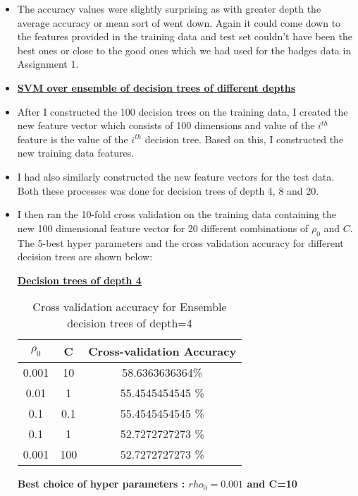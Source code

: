 \documentclass[11pt]{article}
\begin{document}
\begin{itemize}
\item The accuracy values were slightly surprising as with greater depth the average accuracy or mean sort of went down. Again it could come down to the features provided in the training data and test set couldn't  have been the best ones or close to the good ones which we had used for the badges data in Assignment 1.

\item[] \textbf{\underline{SVM over ensemble of decision trees of different depths }}

\item After I constructed the 100 decision trees on the training data, I created the new feature vector which consists of 100 dimensions and value of the $i^{th}$ feature is the value of the $i^{th}$ decision tree. Based on this, I constructed the new training data features.

\item I had also similarly constructed the new feature vectors for the test data. Both these processes was done for decision trees of depth 4, 8 and 20.

\item I then ran the 10-fold cross validation on the training data containing the new 100 dimensional feature vector for 20 different combinations of $\rho_0$ and $C$. The 5-best hyper parameters and the cross validation accuracy for different decision trees are shown below:

\textbf{\underline{ Decision trees of depth 4}}

\begin{table}[h]
	\centering
	\begin{tabular}{|c|c| c|}
		\hline
		\textbf{$\rho_0$}  & \textbf{C} & \textbf{Cross-validation Accuracy} \\
		\hline
		0.001 & 10 & 58.6363636364\% \\
		\hline
		0.01 & 1 & 55.4545454545 \% \\
		\hline
		0.1 & 0.1 & 55.4545454545  \% \\
		\hline
		0.1 & 1 & 52.7272727273 \% \\
		\hline
		0.001& 100 & 52.7272727273 \% \\
		\hline   
	\end{tabular}
	\caption{Cross validation accuracy for Ensemble decision trees of depth=4}
	\label{t2}
\end{table}

\textbf{Best choice of hyper parameters : $rho_0=0.001$ and C=10}


\end{itemize}
\end{document}
